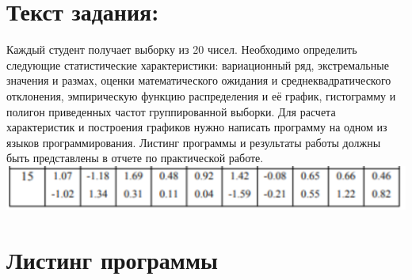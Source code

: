 \documentclass[12pt,one column]{article}
\begin{document}

\newpage
\tableofcontents
\newpage
\section{Текст задания:}
Каждый студент получает выборку из 20 чисел. Необходимо определить следующие статистические характеристики: вариационный ряд, экстремальные значения и размах, оценки математического ожидания и среднеквадратического отклонения, эмпирическую функцию распределения и её график, гистограмму и полигон приведенных частот группированной выборки. Для расчета характеристик и построения графиков нужно написать программу на одном из языков программирования. Листинг программы и результаты работы должны быть представлены в отчете по практической работе.\\
\includegraphics[width=\textwidth]{img/task.png}
\section{Листинг программы}

\end{document}
